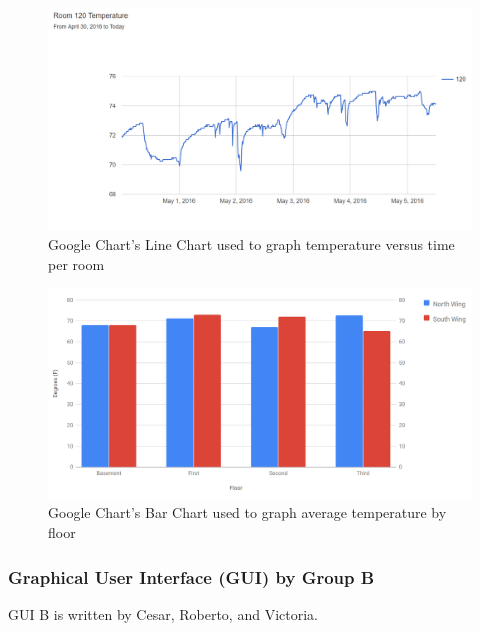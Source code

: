 \documentclass{article}
\begin{document}
				\begin{figure}[H]
					\begin{center}
						\includegraphics[scale=.4]{TempVersusTime.PNG}			
					\end{center}
					\captionsetup{labelformat=empty}
					\caption{Google Chart's Line Chart used to graph temperature versus time per room}
				\end{figure}				
				
				\begin{figure}[H]
					\begin{center}						
						\includegraphics[scale=.5]{averageFloorTemp.PNG}				
					\end{center}
					\captionsetup{labelformat=empty}
					\caption{Google Chart's Bar Chart used to graph average temperature by floor}
				\end{figure}			
			
			\subsubsection{Graphical User Interface (GUI) by Group B}
				GUI B is written by  Cesar, Roberto, and Victoria.
								
			
\end{document}
